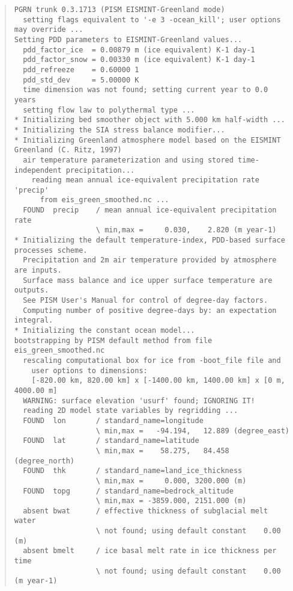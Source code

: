 \begin{table}
\centering
\scriptsize
\begin{quote}
\begin{verbatim}
PGRN trunk 0.3.1713 (PISM EISMINT-Greenland mode)
  setting flags equivalent to '-e 3 -ocean_kill'; user options may override ...
Setting PDD parameters to EISMINT-Greenland values...
  pdd_factor_ice  = 0.00879 m (ice equivalent) K-1 day-1
  pdd_factor_snow = 0.00330 m (ice equivalent) K-1 day-1
  pdd_refreeze    = 0.60000 1
  pdd_std_dev     = 5.00000 K
  time dimension was not found; setting current year to 0.0 years
  setting flow law to polythermal type ...
* Initializing bed smoother object with 5.000 km half-width ...
* Initializing the SIA stress balance modifier...
* Initializing Greenland atmosphere model based on the EISMINT Greenland (C. Ritz, 1997)
  air temperature parameterization and using stored time-independent precipitation...
    reading mean annual ice-equivalent precipitation rate 'precip'
      from eis_green_smoothed.nc ... 
  FOUND  precip    / mean annual ice-equivalent precipitation rate
                   \ min,max =     0.030,    2.820 (m year-1)
* Initializing the default temperature-index, PDD-based surface processes scheme.
  Precipitation and 2m air temperature provided by atmosphere are inputs.
  Surface mass balance and ice upper surface temperature are outputs.
  See PISM User's Manual for control of degree-day factors.
  Computing number of positive degree-days by: an expectation integral.
* Initializing the constant ocean model...
bootstrapping by PISM default method from file eis_green_smoothed.nc
  rescaling computational box for ice from -boot_file file and
    user options to dimensions:
    [-820.00 km, 820.00 km] x [-1400.00 km, 1400.00 km] x [0 m, 4000.00 m]
  WARNING: surface elevation 'usurf' found; IGNORING IT!
  reading 2D model state variables by regridding ...
  FOUND  lon       / standard_name=longitude 
                   \ min,max =   -94.194,   12.889 (degree_east)
  FOUND  lat       / standard_name=latitude  
                   \ min,max =    58.275,   84.458 (degree_north)
  FOUND  thk       / standard_name=land_ice_thickness
                   \ min,max =     0.000, 3200.000 (m)
  FOUND  topg      / standard_name=bedrock_altitude
                   \ min,max = -3859.000, 2151.000 (m)
  absent bwat      / effective thickness of subglacial melt water
                   \ not found; using default constant    0.00 (m)
  absent bmelt     / ice basal melt rate in ice thickness per time
                   \ not found; using default constant    0.00 (m year-1)

\end{verbatim}
\end{quote}
\end{table}
